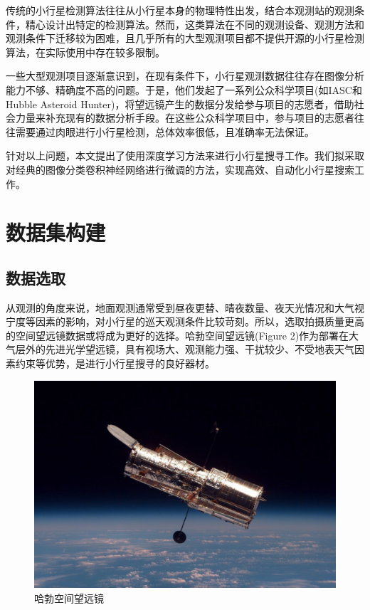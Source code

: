 \documentclass[12pt,a4paper]{article}%
\begin{document}
传统的小行星检测算法往往从小行星本身的物理特性出发，结合本观测站的观测条件，精心设计出特定的检测算法。然而，这类算法在不同的观测设备、观测方法和观测条件下迁移较为困难，且几乎所有的大型观测项目都不提供开源的小行星检测算法，在实际使用中存在较多限制。

一些大型观测项目逐渐意识到，在现有条件下，小行星观测数据往往存在图像分析能力不够、精确度不高的问题。于是，他们发起了一系列公众科学项目(如IASC和Hubble Asteroid Hunter)，将望远镜产生的数据分发给参与项目的志愿者，借助社会力量来补充现有的数据分析手段。在这些公众科学项目中，参与项目的志愿者往往需要通过肉眼进行小行星检测，总体效率很低，且准确率无法保证。

针对以上问题，本文提出了使用深度学习方法来进行小行星搜寻工作。我们拟采取对经典的图像分类卷积神经网络进行微调的方法，实现高效、自动化小行星搜索工作。

\section{数据集构建}

\subsection{数据选取}

从观测的角度来说，地面观测通常受到昼夜更替、晴夜数量、夜天光情况和大气视宁度等因素的影响，对小行星的巡天观测条件比较苛刻。所以，选取拍摄质量更高的空间望远镜数据或将成为更好的选择。哈勃空间望远镜(Figure 2)作为部署在大气层外的先进光学望远镜，具有视场大、观测能力强、干扰较少、不受地表天气因素约束等优势，是进行小行星搜寻的良好器材。

\begin{figure}[H]%
    \centering
    \begin{minipage}{0.7\textwidth}%
        \centering
        \includegraphics[width=1.0%
            \textwidth]{hubble}%
        \caption{\fontsize{10pt}{15pt}\selectfont 哈勃空间望远镜}%
    \end{minipage}
\end{figure}
\end{document}
